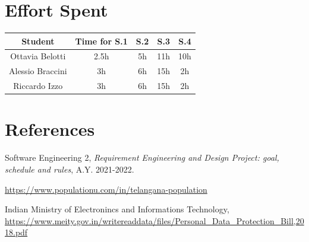\documentclass[table, 12pt]{article}
\begin{document}
\newpage
\section{Effort Spent}
    \begin{tabular}{| c || c | c| c| c |}
        \hline
        Student & Time for S.1 & S.2 & S.3 & S.4 \\ \hline
        Ottavia Belotti & 2.5h & 5h & 11h & 10h \\
        Alessio Braccini & 3h & 6h & 15h & 2h \\
        Riccardo Izzo & 3h & 6h & 15h & 2h \\
        \hline
    \end{tabular}
\section{References}

\begin{thebibliography}{9}
    Software Engineering 2,
    \emph{Requirement Engineering and Design Project: goal, schedule and rules}, A.Y. 2021-2022.

    \url{https://www.populationu.com/in/telangana-population}

    Indian Ministry of Electronincs and Informations Technology, 
    \url{https://www.meity.gov.in/writereaddata/files/Personal_Data_Protection_Bill,2018.pdf}

\end{thebibliography}
\end{document}
